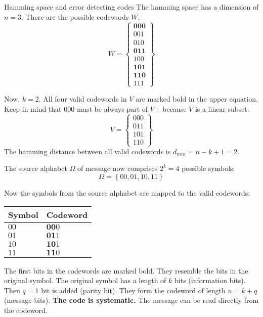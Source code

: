 \begin{refsection}
\begin{example}{Hamming space and error detecting codes}
	The hamming space has a dimension of $n = 3$. There are the possible codewords $W$.
	\begin{equation}
		W = \left\{\begin{matrix}
			\mathbf{000}\\
			001\\
			010\\
			\mathbf{011}\\
			100\\
			\mathbf{101}\\
			\mathbf{110}\\
			111
		\end{matrix}\right\}
	\end{equation}
	
	Now, $k = 2$. All four valid codewords in $V$ are marked bold in the upper equation. Keep in mind that $000$ must be always part of $V$ -- because $V$ is a linear subset.
	\begin{equation}
		V = \left\{\begin{matrix}
			000\\
			011\\
			101\\
			110
		\end{matrix}\right\}
	\end{equation}
	The hamming distance between all valid codewords is $d_{min} = n - k + 1 = 2$.

	The source alphabet $\Omega$ of message now comprises $2^k = 4$ possible symbols:
	\begin{equation}
		\Omega = \left\{00, 01, 10, 11\right\}
	\end{equation}

	Now the symbols from the source alphabet are mapped to the valid codewords:
	\begin{table}[H]
		\centering
		\begin{tabular}{|l|l|}
			\hline
			Symbol & Codeword \\
			\hline
			\hline
			$00$ & $\mathbf{00}0$ \\
			\hline
			$01$ & $\mathbf{01}1$ \\
			\hline
			$10$ & $\mathbf{10}1$ \\
			\hline
			$11$ & $\mathbf{11}0$ \\
			\hline
		\end{tabular}
	\end{table}
	The first bits in the codewords are marked bold. They resemble the bits in the original symbol. The original symbol has a length of $k$ bits (information bits). Then $q = 1$ bit is added (parity bit). They form the codeword of length $n = k + q$ (message bits). \textbf{The code is systematic.} The message can be read directly from the codeword.
	

\end{example}
\end{refsection}
